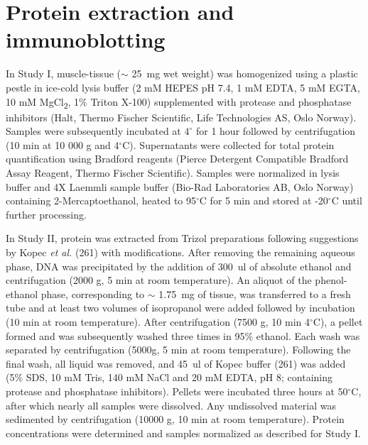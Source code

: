\documentclass[twoside,10pt]{gihclass} %
\begin{document}
\hypertarget{protein-extraction-and-immunoblotting}{%
\section{Protein extraction and immunoblotting}\label{protein-extraction-and-immunoblotting}}

In Study I, muscle-tissue (\(\sim\) \SI{25}{mg} wet weight) was homogenized using a plastic pestle in ice-cold lysis buffer (2 mM HEPES pH 7.4, 1 mM EDTA, 5 mM EGTA, 10 mM MgCl\textsubscript{2}, 1\(\%\) Triton X-100) supplemented with protease and phosphatase inhibitors (Halt, Thermo Fischer Scientific, Life Technologies AS, Oslo Norway). Samples were subsequently incubated at \(4^{\circ}\) for 1 hour followed by centrifugation (10 min at 10 000 g and 4\(^{\circ}\)C). Supernatants were collected for total protein quantification using Bradford reagents (Pierce Detergent Compatible Bradford Assay Reagent, Thermo Fischer Scientific).
Samples were normalized in lysis buffer and 4X Laemmli sample buffer (Bio-Rad Laboratories AB, Oslo Norway) containing 2-Mercaptoethanol, heated to 95\(^{\circ}\)C for 5 min and stored at -20\(^{\circ}\)C until further processing.

In Study II, protein was extracted from Trizol preparations following suggestions by Kopec \emph{et al.} (261)
with modifications. After removing the remaining aqueous phase, DNA was precipitated by the addition of \SI{300}{ul} of absolute ethanol and centrifugation (2000 g, 5 min at room temperature). An aliquot of the phenol-ethanol phase, corresponding to \(\sim\) \SI{1.75}{mg} of tissue, was transferred to a fresh tube and at least two volumes of isopropanol were added followed by incubation (10 min at room temperature). After centrifugation (7500 g, 10 min 4\(^{\circ}\)C), a pellet formed and was subsequently washed three times in 95\% ethanol. Each wash was separated by centrifugation (5000g, 5 min at room temperature). Following the final wash, all liquid was removed, and \SI{45}{ul} of Kopec buffer (261) was added (5\% SDS, 10 mM Tris, 140 mM NaCl and 20 mM EDTA, pH 8; containing protease and phosphatase inhibitors).
Pellets were incubated three hours at 50\(^{\circ}\)C, after which nearly all samples were dissolved.
Any undissolved material was sedimented by centrifugation (10000 g, 10 min at room temperature).
Protein concentrations were determined and samples normalized as described for Study I.
\end{document}
